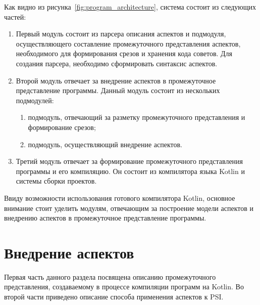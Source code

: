 Как видно из рисунка~\ref{fig:program_architecture}, система состоит из
следующих частей:
\begin{enumerate}
	\item Первый модуль состоит из парсера описания аспектов и подмодуля, осуществляющего составление промежуточного представления аспектов, необходимого для формирования срезов и хранения кода советов.
	Для создания парсера, необходимо сформировать синтаксис аспектов.
	\item Второй модуль отвечает за внедрение аспектов в промежуточное представление программы.
		Данный модуль состоит из нескольких подмодулей: 
		\begin{enumerate}
		 	\item подмодуль, отвечающий за разметку промежуточного представления и формирование срезов;
		 	\item подмодуль, осуществляющий внедрение аспектов.
		 \end{enumerate} 
	\item Третий модуль отвечает за формирование промежуточного представления программы и его компиляцию.
	Он состоит из компилятора языка Kotlin и системы сборки проектов.
\end{enumerate}

Ввиду возможности использования готового компилятора Kotlin, основное внимание стоит уделить модулям, отвечающим за построение модели аспектов и внедрению аспектов в промежуточное представление программы.
\section{Внедрение аспектов}
\label{sub:custom_aspect_weaving}
Первая часть данного раздела посвящена описанию промежуточного представления,
создаваемому в процессе компиляции программ на Kotlin.
Во второй части приведено описание способа применения аспектов к PSI.
